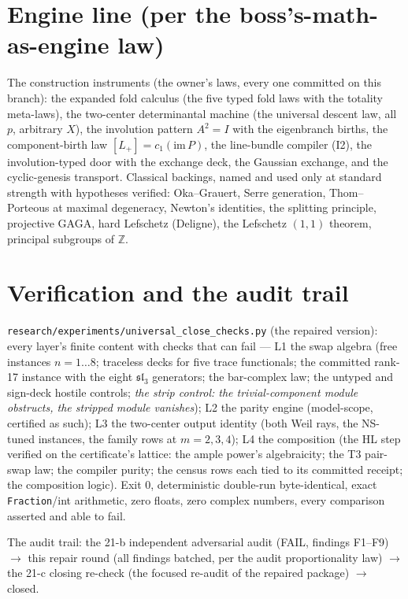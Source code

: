 \documentclass[11pt]{article}
\begin{document}
\section{Engine line (per the boss's-math-as-engine law)}

The construction instruments (the owner's laws, every one committed on
this branch): the expanded fold calculus (the five typed fold laws with
the totality meta-laws), the two-center determinantal machine (the
universal descent law, all $p$, arbitrary $X$), the involution pattern
$A^2 = I$ with the eigenbranch births, the component-birth law
$[L_+] = c_1(\mathrm{im}\,P)$, the line-bundle compiler (I2), the
involution-typed door with the exchange deck, the Gaussian exchange, and
the cyclic-genesis transport. Classical backings, named and used only at
standard strength with hypotheses verified: Oka--Grauert, Serre
generation, Thom--Porteous at maximal degeneracy, Newton's identities,
the splitting principle, projective GAGA, hard Lefschetz (Deligne), the
Lefschetz $(1,1)$ theorem, principal subgroups of $\mathbb{Z}$.

\section{Verification and the audit trail}

\texttt{research/experiments/universal\_close\_checks.py} (the repaired
version): every layer's finite content with checks that can fail ---
L1 the swap algebra (free instances $n = 1 \ldots 8$; traceless decks for
five trace functionals; the committed rank-17 instance with the eight
$\mathfrak{sl}_3$ generators; the bar-complex law; the untyped and
sign-deck hostile controls; \emph{the strip control: the trivial-component
module obstructs, the stripped module vanishes}); L2 the parity engine
(model-scope, certified as such); L3 the two-center output identity (both
Weil rays, the NS-tuned instances, the family rows at $m = 2, 3, 4$);
L4 the composition (the HL step verified on the certificate's lattice:
the ample power's algebraicity; the T3 pair-swap law; the compiler purity;
the census rows each tied to its committed receipt; the composition
logic). Exit 0, deterministic double-run byte-identical, exact
\texttt{Fraction}/int arithmetic, zero floats, zero complex numbers, every
comparison asserted and able to fail.

The audit trail: the 21-b independent adversarial audit (FAIL, findings
F1--F9) $\to$ this repair round (all findings batched, per the audit
proportionality law) $\to$ the 21-c closing re-check (the focused re-audit
of the repaired package) $\to$ closed.
\end{document}
